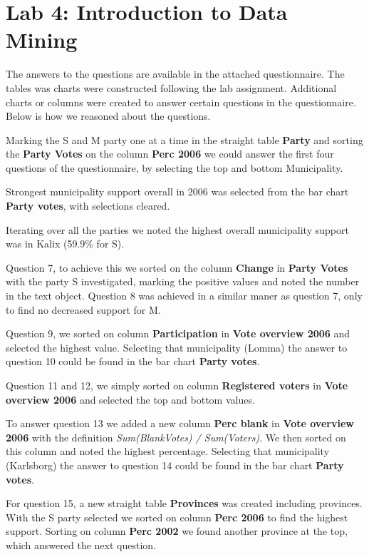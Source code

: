\documentclass[a4paper]{article}
\begin{document}
\section{Lab 4: Introduction to Data Mining}
The answers to the questions are available in the attached questionnaire. The tables was charts were constructed following the lab assignment. Additional charts or columns were created to answer certain questions in the questionnaire. Below is how we reasoned about the questions.

Marking the S and M party one at a time in the straight table \textbf{Party} and sorting the \textbf{Party Votes} on the column \textbf{Perc 2006} we could answer the first four questions of the questionnaire, by selecting the top and bottom Municipality.

Strongest municipality support overall in 2006 was selected from the bar chart \textbf{Party votes}, with selections cleared. 

Iterating over all the parties we noted the highest overall municipality support was in Kalix (59.9\% for S).

Question 7, to achieve this we sorted on the column \textbf{Change} in \textbf{Party Votes} with the party S investigated, marking the positive values and noted the number in the text object. 
Question 8 was achieved in a similar maner as question 7, only to find no decreased support for M.

Question 9, we sorted on column \textbf{Participation} in \textbf{Vote overview 2006} and selected the highest value. Selecting that municipality (Lomma) the answer to question 10 could be found in the bar chart \textbf{Party votes}.

Question 11 and 12, we simply sorted on column \textbf{Registered voters} in \textbf{Vote overview 2006} and selected the top and bottom values.

To answer question 13 we added a new column \textbf{Perc blank} in \textbf{Vote overview 2006} with the definition \textit{Sum(BlankVotes) / Sum(Voters)}. We then sorted on this column and noted the highest percentage. Selecting that municipality (Karlsborg) the answer to question 14 could be found in the bar chart \textbf{Party votes}.

For question 15, a new straight table \textbf{Provinces} was created including provinces. With the S party selected we sorted on column \textbf{Perc 2006} to find the highest support. Sorting on column \textbf{Perc 2002} we found another province at the top, which answered the next question.
\end{document}
